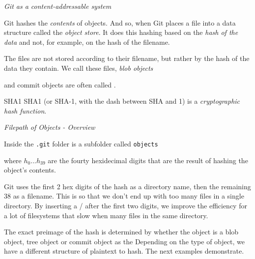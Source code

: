\frmrule 

\textit{Git as a content-addressable system}



Git hashes the \textit{contents} of objects. 
And so, when Git
places a file into a data structure called the \textit{object store}. 
It does this hashing based on the \textit{hash of the data} and not,
for example, on the hash of the filename. 

The files are not stored according to their filename, 
but rather by the hash of the data they contain. 
We call these files, \textit{blob objects}


and commit objects are often called . 

\begin{sidenote}{SHA1}
SHA1 (or SHA-1, with the dash between SHA and 1) is a \textit{cryptographic hash function}. 
\end{sidenote}






\frmrule 

\textit{Filepath of Objects - Overview}

Inside the \lstinline{.git} folder is a 
subfolder called \lstinline{objects}



where $h_0...h_{39}$ are the fourty hexidecimal digits 
that are the result of hashing the object's contents. 

Git uses the first 2 hex digits of the hash as a directory name, then the remaining 38 as a filename. 
This is so that we don't end up with too many files in a single directory. 
By inserting a / after the first two digits, we improve the efficiency for a lot of filesystems
that slow when many files in the same directory. 

The exact preimage of the hash is determined by whether 
the object is a blob object, tree object or commit object as the 
Depending on the type of object, we 
have a different structure of plaintext to hash.
The next examples demonstrate.  

\frmrule 

